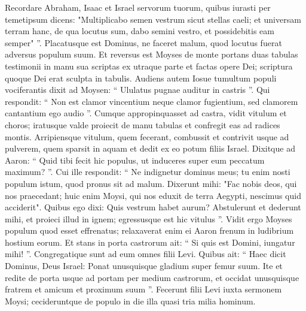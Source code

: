 \begin{biblechapter}
\begin{biblechapter}
\begin{biblechapter}
\begin{biblechapter}
\begin{biblechapter}
\begin{biblechapter}
\begin{biblechapter}
\begin{biblechapter}
\begin{biblechapter}
\begin{biblechapter}
\begin{biblechapter}
\begin{biblechapter}
\begin{biblechapter}
\begin{biblechapter}
\begin{biblechapter}
\begin{biblechapter}
\begin{biblechapter}
\begin{biblechapter}
\begin{biblechapter}
\begin{biblechapter}
\begin{biblechapter}
\begin{biblechapter}
\begin{biblechapter}
\begin{biblechapter}
\begin{biblechapter}
\begin{biblechapter}
\begin{biblechapter}
\begin{biblechapter}
\begin{biblechapter}
\begin{biblechapter}
\begin{biblechapter}
\begin{biblechapter}
\verse Recordare Abraham, Isaac et Israel servorum tuorum, quibus iurasti per temetipsum dicens: "Multiplicabo semen vestrum sicut stellas caeli; et universam terram hanc, de qua locutus sum, dabo semini vestro, et possidebitis eam semper" ”. 
\verse Placatusque est Dominus, ne faceret malum, quod locutus fuerat adversus populum suum.
 \verse Et reversus est Moyses de monte portans duas tabulas testimonii in manu sua scriptas ex utraque parte 
\verse et factas opere Dei; scriptura quoque Dei erat sculpta in tabulis. 
\verse Audiens autem Iosue tumultum populi vociferantis dixit ad Moysen: “ Ululatus pugnae auditur in castris ”. 
\verse Qui respondit:
 “ Non est clamor vincentium
 neque clamor fugientium,
 sed clamorem cantantium
 ego audio ”.
 \verse Cumque appropinquasset ad castra, vidit vitulum et choros; iratusque valde proiecit de manu tabulas et confregit eas ad radices montis. 
\verse Arripiensque vitulum, quem fecerant, combussit et contrivit usque ad pulverem, quem sparsit in aquam et dedit ex eo potum filiis Israel.
 \verse Dixitque ad Aaron: “ Quid tibi fecit hic populus, ut induceres super eum peccatum maximum? ”. 
\verse Cui ille respondit: “ Ne indignetur dominus meus; tu enim nosti populum istum, quod pronus sit ad malum. 
\verse Dixerunt mihi: "Fac nobis deos, qui nos praecedant; huic enim Moysi, qui nos eduxit de terra Aegypti, nescimus quid acciderit". 
\verse Quibus ego dixi: Quis vestrum habet aurum? Abstulerunt et dederunt mihi, et proieci illud in ignem; egressusque est hic vitulus ”.
 \verse Vidit ergo Moyses populum quod esset effrenatus; relaxaverat enim ei Aaron frenum in ludibrium hostium eorum. 
\verse Et stans in porta castrorum ait: “ Si quis est Domini, iungatur mihi! ”. Congregatique sunt ad eum omnes filii Levi. 
\verse Quibus ait: “ Haec dicit Dominus, Deus Israel: Ponat unusquisque gladium super femur suum. Ite et redite de porta usque ad portam per medium castrorum, et occidat unusquisque fratrem et amicum et proximum suum ”. 
\verse Fecerunt filii Levi iuxta sermonem Moysi; cecideruntque de populo in die illa quasi tria milia hominum. 

\end{biblechapter}
\end{biblechapter}
\end{biblechapter}
\end{biblechapter}
\end{biblechapter}
\end{biblechapter}
\end{biblechapter}
\end{biblechapter}
\end{biblechapter}
\end{biblechapter}
\end{biblechapter}
\end{biblechapter}
\end{biblechapter}
\end{biblechapter}
\end{biblechapter}
\end{biblechapter}
\end{biblechapter}
\end{biblechapter}
\end{biblechapter}
\end{biblechapter}
\end{biblechapter}
\end{biblechapter}
\end{biblechapter}
\end{biblechapter}
\end{biblechapter}
\end{biblechapter}
\end{biblechapter}
\end{biblechapter}
\end{biblechapter}
\end{biblechapter}
\end{biblechapter}
\end{biblechapter}
